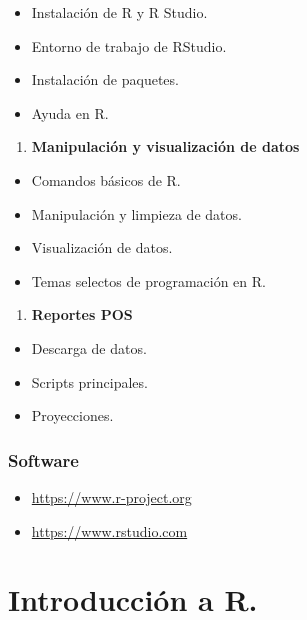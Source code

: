 \documentclass[
]{book}
\providecommand{\tightlist}{%
  \setlength{\itemsep}{0pt}\setlength{\parskip}{0pt}}
\begin{document}
\begin{itemize}
\tightlist
\item
  Instalación de R y R Studio.
\item
  Entorno de trabajo de RStudio.
\item
  Instalación de paquetes.
\item
  Ayuda en R.
\end{itemize}

\begin{enumerate}
\def\labelenumi{\arabic{enumi}.}
\setcounter{enumi}{1}
\tightlist
\item
  \textbf{Manipulación y visualización de datos}
\end{enumerate}

\begin{itemize}
\tightlist
\item
  Comandos básicos de R.
\item
  Manipulación y limpieza de datos.
\item
  Visualización de datos.
\item
  Temas selectos de programación en R.
\end{itemize}

\begin{enumerate}
\def\labelenumi{\arabic{enumi}.}
\setcounter{enumi}{2}
\tightlist
\item
  \textbf{Reportes POS}
\end{enumerate}

\begin{itemize}
\tightlist
\item
  Descarga de datos.
\item
  Scripts principales.
\item
  Proyecciones.
\end{itemize}

\hypertarget{software}{%
\subsection*{Software}\label{software}}

\begin{itemize}
\tightlist
\item
  \url{https://www.r-project.org}
\item
  \url{https://www.rstudio.com}
\end{itemize}

\hypertarget{introducciuxf3n-a-r.}{%
\chapter{Introducción a R.}\label{introducciuxf3n-a-r.}}
\end{document}
